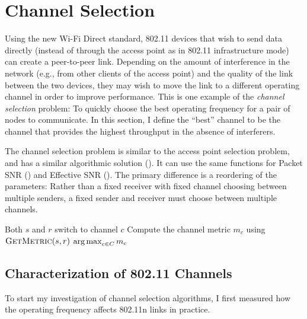 \section{Channel Selection}\label{sec:esnr_chansel}
Using the new Wi-Fi Direct standard, 802.11 devices that wish to send data directly (instead of through the access point as in 802.11 infrastructure mode) can create a peer-to-peer link. Depending on the amount of interference in the network (e.g., from other clients of the access point) and the quality of the link between the two devices, they may wish to move the link to a different operating channel in order to improve performance. This is one example of the \emph{channel selection} problem: To quickly choose the best operating frequency for a pair of nodes to communicate. In this section, I define the ``best'' channel to be the channel that provides the highest throughput in the absence of interferers.

The channel selection problem is similar to the access point selection problem, and has a similar algorithmic solution (). It can use the same  functions for Packet SNR () and Effective SNR (). The primary difference is a reordering of the parameters: Rather than a fixed receiver with fixed channel choosing between multiple senders, a fixed sender and receiver must choose between multiple channels.

\begin{algorithm}[thp]
\caption{\label{alg:chan_sel_basic}}
\begin{algorithmic}[1]
\STATE Both $s$ and $r$ switch to channel $c$
\STATE Compute the channel metric $m_c$ using $\textsc{GetMetric}(s,r)$
\ENDFOR
\RETURN $\operatorname*{arg\,max}_{c\in C} m_c$ \hfill {}
\end{algorithmic}
\end{algorithm}

\subsection{Characterization of 802.11 Channels}
To start my investigation of channel selection algorithms, I first measured how the operating frequency affects 802.11n links in practice.

